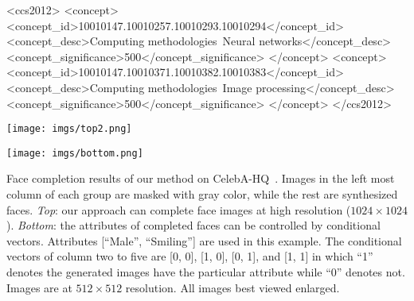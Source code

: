\documentclass[acmtog,timestamp]{acmart}
\begin{document}
%
%
\begin{CCSXML}
<ccs2012>
<concept>
<concept_id>10010147.10010257.10010293.10010294</concept_id>
<concept_desc>Computing methodologies~Neural networks</concept_desc>
<concept_significance>500</concept_significance>
</concept>
<concept>
<concept_id>10010147.10010371.10010382.10010383</concept_id>
<concept_desc>Computing methodologies~Image processing</concept_desc>
<concept_significance>500</concept_significance>
</concept>
</ccs2012>
\end{CCSXML}


%
%



\begin{teaserfigure}
  \begin{center}
      \centering
      \begin{minipage}{1.0\textwidth}
          \centering
          \texttt{[image: imgs/top2.png]} %
      \end{minipage}\vfill
      \begin{minipage}{1.0\textwidth}
          \centering
          \texttt{[image: imgs/bottom.png]} %
      \end{minipage}
  \end{center}%
  \caption{Face completion results of our method on CelebA-HQ~\cite{karras2017progressive}. Images in the left most column of each group are masked with gray color, while the rest are synthesized faces. \textit{Top}: our approach can complete face images at high resolution ($1024\times1024$). \textit{Bottom}: the attributes of completed faces can be controlled by conditional vectors. Attributes [``Male'', ``Smiling''] are used in this example. The conditional vectors of column two to five are [0, 0], [1, 0], [0, 1], and [1, 1] in which ``1'' denotes the generated images have the particular attribute while ``0'' denotes not. Images are at $512\times512$ resolution. All images best viewed enlarged.}
  \label{fig:teaser}
\end{teaserfigure}

\maketitle
\end{document}
